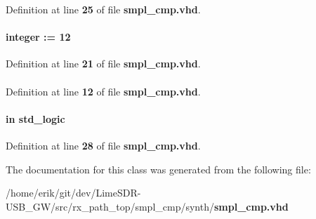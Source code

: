 Definition at line {\bf 25} of file {\bf smpl\+\_\+cmp.\+vhd}.

\paragraph[{smpl\+\_\+width}]{ {\bfseries \textcolor{vhdlchar}{ }} {\bfseries \textcolor{comment}{integer}\textcolor{vhdlchar}{ }\textcolor{vhdlchar}{ }\textcolor{vhdlchar}{\+:}\textcolor{vhdlchar}{=}\textcolor{vhdlchar}{ }\textcolor{vhdlchar}{ } \textcolor{vhdldigit}{12} \textcolor{vhdlchar}{ }} \hspace{0.3cm}{\ttfamily [Generic]}}\label{classsmpl__cmp_a4a3ddf68e9a3931522c0d1d334baa160}


Definition at line {\bf 21} of file {\bf smpl\+\_\+cmp.\+vhd}.

\paragraph[{std\+\_\+logic\+\_\+1164}]{\hspace{0.3cm}{\ttfamily [Package]}}\label{classsmpl__cmp_acd03516902501cd1c7296a98e22c6fcb}


Definition at line {\bf 12} of file {\bf smpl\+\_\+cmp.\+vhd}.

\paragraph[{trxiqpulse}]{ {\bfseries \textcolor{keywordflow}{in}\textcolor{vhdlchar}{ }} {\bfseries \textcolor{comment}{std\+\_\+logic}\textcolor{vhdlchar}{ }} \hspace{0.3cm}{\ttfamily [Port]}}\label{classsmpl__cmp_a808d6d382f3c6a02784a160f67d0f891}


Definition at line {\bf 28} of file {\bf smpl\+\_\+cmp.\+vhd}.



The documentation for this class was generated from the following file\+:\begin{DoxyCompactItemize}
\item 
/home/erik/git/dev/\+Lime\+S\+D\+R-\/\+U\+S\+B\+\_\+\+G\+W/src/rx\+\_\+path\+\_\+top/smpl\+\_\+cmp/synth/{\bf smpl\+\_\+cmp.\+vhd}\end{DoxyCompactItemize}
